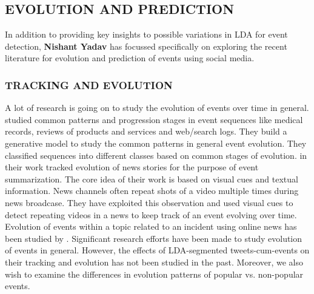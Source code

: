 \subsection{\uppercase{Evolution and Prediction}}
In addition to providing key insights to possible variations in LDA for event detection, {\bf Nishant Yadav} has focussed specifically on exploring the recent literature for evolution and prediction of events using social media.

\subsubsection{\uppercase{Tracking and Evolution}}
A lot of research is going on to study the evolution of events over time in general. \cite{yang2014finding} studied common patterns and progression stages in event sequences like medical records, reviews of products and services and web/search logs. They build a generative model to study the common patterns in general event evolution. They classified sequences into different classes based on common stages of evolution. \cite{duygulu2004towards} in their work tracked evolution of news stories for the purpose of event summarization. The core idea of their work is based on visual cues and textual information. News channels often repeat shots of a video multiple times during news broadcase. They have exploited this observation and used visual cues to detect repeating videos in a news to keep track of an event evolving over time. Evolution of events within a topic related to an incident using online news has been studied by \cite{yang2009discovering}. Significant research efforts have been made to study evolution of events in general. However, the effects of LDA-segmented tweets-cum-events on their tracking and evolution has not been studied in the past. Moreover, we also wish to examine the differences in evolution patterns of popular vs. non-popular events.

